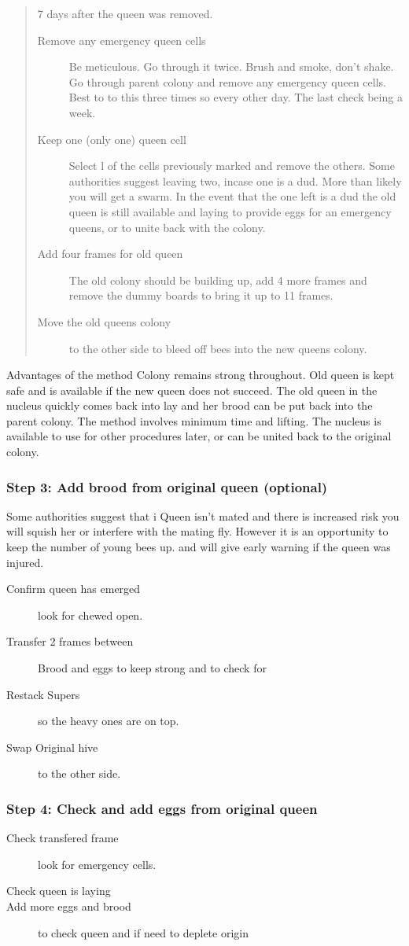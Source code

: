 \begin{quotation}
7 days after the queen was removed.
\begin{description}
  \item[Remove any emergency queen cells] Be meticulous.  Go through it twice.  Brush and smoke, don't shake.
	Go through parent colony and remove any emergency queen cells.  Best to to this three times so every other day.  The last check being a week.
  \item[Keep one (only one) queen cell]
	Select l of the cells previously marked and remove the others.
	Some authorities suggest leaving two, incase one is a dud.
	More than likely you will get a swarm.
	In the event that the one left is a dud the old queen is still available and laying to provide eggs for an emergency queens,
	or to unite back with the colony.
  \item[Add four frames for old queen] The old colony should be building up, add 4 more frames and remove the dummy boards to bring it up to 11 frames.
  \item[Move the old queens colony] to the other side to bleed off bees into the new queens colony.
\end{description}
\end{quotation}

Advantages of the method
Colony remains strong throughout.
Old queen is kept safe and is available if the new queen does not succeed.
The old queen in the nucleus quickly comes back into lay and her brood can be put back into the parent colony.
The method involves minimum time and lifting.
The nucleus is available to use for other procedures later, or can be united back to the original colony.

\subsubsection*{Step 3: Add brood from original queen (optional)}

Some authorities suggest that i
Queen isn't mated and there is increased risk you will squish her or interfere with the mating fly.
However it is an opportunity to keep the number of young bees up.
and will give early warning if the queen was injured.

\begin{description}
  \item[Confirm queen has emerged] look for chewed open.
  \item[Transfer 2 frames between] Brood and eggs to keep strong and to check for
  \item[Restack Supers] so the heavy ones are on top.
  \item[Swap Original hive] to the other side.
\end{description}

\subsubsection*{Step 4: Check and add eggs from original queen}

\begin{description}
  \item[Check transfered frame] look for emergency cells.
  \item[Check queen is laying] 
  \item[Add more eggs and brood] to check queen and if need to deplete origin
\end{description}





